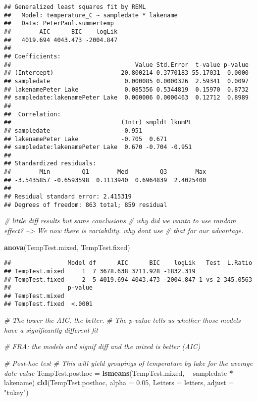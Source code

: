 \documentclass[]{article}
\newenvironment{Shaded}{\begin{snugshade}}{\end{snugshade}}
\newcommand{\KeywordTok}[1]{\textcolor[rgb]{0.13,0.29,0.53}{\textbf{#1}}}
\newcommand{\DataTypeTok}[1]{\textcolor[rgb]{0.13,0.29,0.53}{#1}}
\newcommand{\FloatTok}[1]{\textcolor[rgb]{0.00,0.00,0.81}{#1}}
\newcommand{\StringTok}[1]{\textcolor[rgb]{0.31,0.60,0.02}{#1}}
\newcommand{\CommentTok}[1]{\textcolor[rgb]{0.56,0.35,0.01}{\textit{#1}}}
\newcommand{\OperatorTok}[1]{\textcolor[rgb]{0.81,0.36,0.00}{\textbf{#1}}}
\newcommand{\NormalTok}[1]{#1}
\begin{document}
\begin{verbatim}
## Generalized least squares fit by REML
##   Model: temperature_C ~ sampledate * lakename 
##   Data: PeterPaul.summertemp 
##        AIC      BIC    logLik
##   4019.694 4043.473 -2004.847
## 
## Coefficients:
##                                   Value Std.Error  t-value p-value
## (Intercept)                   20.800214 0.3770183 55.17031  0.0000
## sampledate                     0.000085 0.0000326  2.59341  0.0097
## lakenamePeter Lake             0.085356 0.5344819  0.15970  0.8732
## sampledate:lakenamePeter Lake  0.000006 0.0000463  0.12712  0.8989
## 
##  Correlation: 
##                               (Intr) smpldt lknmPL
## sampledate                    -0.951              
## lakenamePeter Lake            -0.705  0.671       
## sampledate:lakenamePeter Lake  0.670 -0.704 -0.951
## 
## Standardized residuals:
##        Min         Q1        Med         Q3        Max 
## -3.5435857 -0.6593598  0.1113940  0.6964839  2.4025400 
## 
## Residual standard error: 2.415319 
## Degrees of freedom: 863 total; 859 residual
\end{verbatim}

\begin{Shaded}
\begin{Highlighting}[]
\CommentTok{# little diff results but same conclusions}
\CommentTok{# why did we wanto to use random effect? --> We now there is variability. why dont use }
\CommentTok{# that for our advantage.}

\KeywordTok{anova}\NormalTok{(TempTest.mixed, TempTest.fixed)}
\end{Highlighting}
\end{Shaded}

\begin{verbatim}
##                Model df      AIC      BIC    logLik   Test  L.Ratio
## TempTest.mixed     1  7 3678.638 3711.928 -1832.319                
## TempTest.fixed     2  5 4019.694 4043.473 -2004.847 1 vs 2 345.0563
##                p-value
## TempTest.mixed        
## TempTest.fixed  <.0001
\end{verbatim}

\begin{Shaded}
\begin{Highlighting}[]
\CommentTok{# The lower the AIC, the better.}
\CommentTok{# The p-value tells us whether those models have a significantly different fit}

\CommentTok{# FRA: the models and signif diff and the mixed is better (AIC)}

\CommentTok{# Post-hoc test}
\CommentTok{# This will yield groupings of temperature by lake for the average date value}
\NormalTok{TempTest.posthoc =}\StringTok{ }\KeywordTok{lsmeans}\NormalTok{(TempTest.mixed, }\OperatorTok{~}\StringTok{ }\NormalTok{sampledate }\OperatorTok{*}\StringTok{ }\NormalTok{lakename)}
\KeywordTok{cld}\NormalTok{(TempTest.posthoc, }\DataTypeTok{alpha =} \FloatTok{0.05}\NormalTok{, }\DataTypeTok{Letters =}\NormalTok{ letters, }\DataTypeTok{adjust =} \StringTok{"tukey"}\NormalTok{)}
\end{Highlighting}
\end{Shaded}
\end{document}
